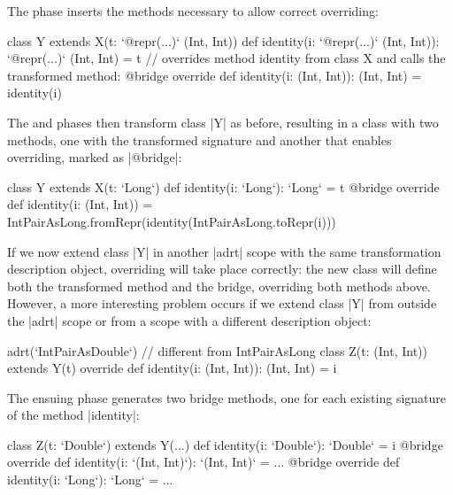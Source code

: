 The \bridge{} phase inserts the methods necessary to allow correct overriding:

\begin{lstlisting-nobreak}
class Y extends X(t: `@repr(...)` (Int, Int)) {
  def identity(i: `@repr(...)` (Int, Int)): `@repr(...)` (Int, Int) = t
  // overrides method identity from class X and calls the transformed method:
  @bridge override def identity(i: (Int, Int)): (Int, Int) = identity(i)
}
\end{lstlisting-nobreak}

The \coerce{} and \commit{} phases then transform class |Y| as before, resulting in a class with two methods, one with the transformed signature and another that enables overriding, marked as |@bridge|:

\begin{lstlisting-nobreak}
class Y extends X(t: `Long`) {
  def identity(i: `Long`): `Long` = t
  @bridge override def identity(i: (Int, Int)) =
    IntPairAsLong.fromRepr(identity(IntPairAsLong.toRepr(i)))
}
\end{lstlisting-nobreak}

If we now extend class |Y| in another |adrt| scope with the same transformation description object, overriding will take place correctly: the new class will define both the transformed method and the bridge, overriding both methods above. However, a more interesting problem occurs if we extend class |Y| from outside the |adrt| scope or from a scope with a different description object:

\begin{lstlisting-nobreak}
adrt(`IntPairAsDouble`) { // different from IntPairAsLong
  class Z(t: (Int, Int)) extends Y(t) {
    override def identity(i: (Int, Int)): (Int, Int) = i
  }
}
\end{lstlisting-nobreak}

The ensuing \bridge{} phase generates two bridge methods, one for each existing signature of the method |identity|:

\begin{lstlisting-nobreak}
class Z(t: `Double`) extends Y(...) {
  def identity(i: `Double`): `Double` = i
  @bridge override def identity(i: `(Int, Int)`): `(Int, Int)` = ...
  @bridge override def identity(i: `Long`): `Long` = ...
}
\end{lstlisting-nobreak}



